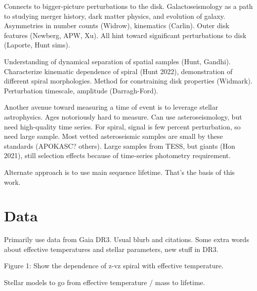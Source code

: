 Connects to bigger-picture perturbations to the disk.
Galactoseismology as a path to studying merger history, dark matter physics, and evolution of galaxy. Asymmetries in number counts (Widrow), kinematics (Carlin). Outer disk features (Newberg, APW, Xu). All hint toward significant perturbations to disk (Laporte, Hunt sims).

Understanding of dynamical separation of spatial samples (Hunt, Gandhi). Characterize kinematic dependence of spiral (Hunt 2022), demonstration of different spiral morphologies. Method for constraining disk properties (Widmark). Perturbation timescale, amplitude (Darragh-Ford).

Another avenue toward measuring a time of event is to leverage stellar astrophysics. Ages notoriously hard to measure. Can use asteroseismology, but need high-quality time series. For spiral, signal is few percent perturbation, so need large sample. Most vetted asteroseismic samples are small by these standards (APOKASC? others). Large samples from TESS, but giants (Hon 2021), still selection effects because of time-series photometry requirement.

Alternate approach is to use main sequence lifetime. That's the basis of this work.


\section{Data} \label{sec:data}

Primarily use data from Gaia DR3. Usual blurb and citations. Some extra words about effective temperatures and stellar parameters, new stuff in DR3.

Figure 1: Show the dependence of z-vz spiral with effective temperature.


Stellar models to go from effective temperature / mass to lifetime.


